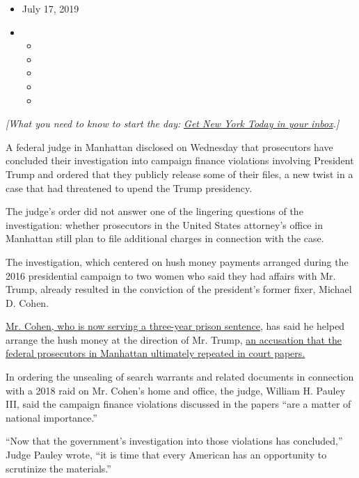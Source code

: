 \begin{itemize}
\item
  July 17, 2019
\item
  \begin{itemize}
  \item
  \item
  \item
  \item
  \item
  \end{itemize}
\end{itemize}

\emph{{[}What you need to know to start the day:}
\href{https://www.nytimes.com/newsletters/newyorktoday?module=inline}{\emph{Get
New York Today in your inbox}}\emph{.{]}}

A federal judge in Manhattan disclosed on Wednesday that prosecutors
have concluded their investigation into campaign finance violations
involving President Trump and ordered that they publicly release some of
their files, a new twist in a case that had threatened to upend the
Trump presidency.

The judge's order did not answer one of the lingering questions of the
investigation: whether prosecutors in the United States attorney's
office in Manhattan still plan to file additional charges in connection
with the case.

The investigation, which centered on hush money payments arranged during
the 2016 presidential campaign to two women who said they had affairs
with Mr. Trump, already resulted in the conviction of the president's
former fixer, Michael D. Cohen.

\href{https://www.nytimes.com/2018/12/12/nyregion/michael-cohen-sentence-trump.html}{Mr.
Cohen, who is now serving a three-year prison sentence}, has said he
helped arrange the hush money at the direction of Mr. Trump,
\href{https://www.nytimes.com/2018/12/07/nyregion/michael-cohen-sentence.html}{an
accusation that the federal prosecutors in Manhattan ultimately repeated
in court papers.}

In ordering the unsealing of search warrants and related documents in
connection with a 2018 raid on Mr. Cohen's home and office, the judge,
William H. Pauley III, said the campaign finance violations discussed in
the papers ``are a matter of national importance.''

``Now that the government's investigation into those violations has
concluded,'' Judge Pauley wrote, ``it is time that every American has an
opportunity to scrutinize the materials.''

